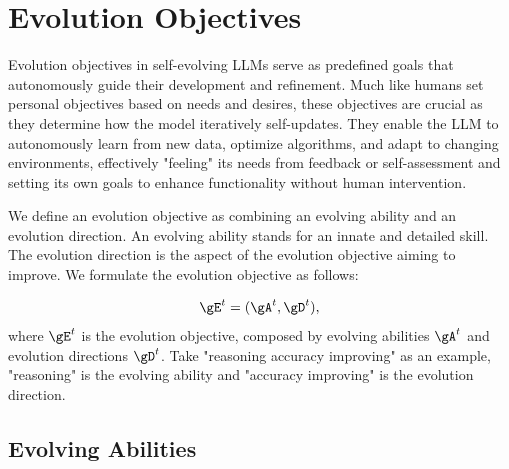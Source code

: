 \documentclass[sn-basic, Numbered]{sn-jnl}%
\theoremstyle{thmstyleone}%
\theoremstyle{thmstyletwo}%
\theoremstyle{thmstylethree}%
\begin{document}


% 

\section{Evolution Objectives}
\label{sec:objective}
Evolution objectives in self-evolving LLMs serve as predefined goals that autonomously guide their development and refinement. Much like humans set personal objectives based on needs and desires, these objectives are crucial as they determine how the model iteratively self-updates. They enable the LLM to autonomously learn from new data, optimize algorithms, and adapt to changing environments, effectively "feeling" its needs from feedback or self-assessment and setting its own goals to enhance functionality without human intervention. 

We define an evolution objective as combining an evolving ability and an evolution direction. An evolving ability stands for an innate and detailed skill. The evolution direction is the aspect of the evolution objective aiming to improve. We formulate the evolution objective as follows:

\begin{equation}
    \gE^{t} = ( \gA^{t}, \gD^{t} ), %
\end{equation}
where $ \gE^{t}$ is the evolution objective, composed by evolving abilities $\gA^{t}$ and  evolution directions $\gD^{t}$. Take "reasoning accuracy improving" as an example, "reasoning" is the evolving ability and "accuracy improving" is the evolution direction.

\subsection{Evolving Abilities}
\end{document}
